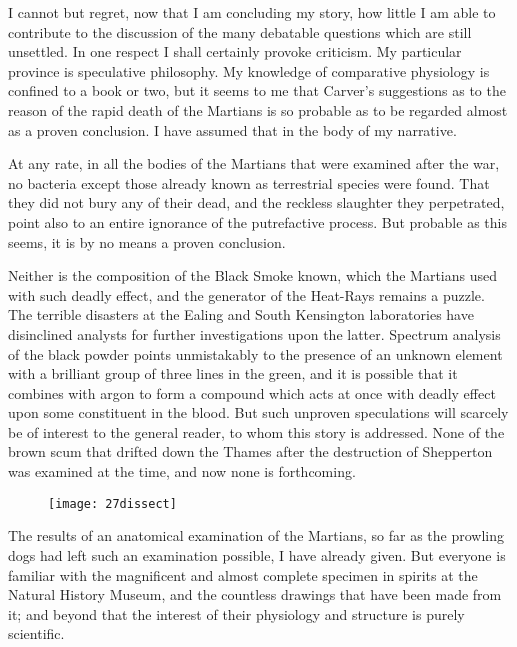 

	\lettrine[lines=4]{I}{} cannot but regret, now that I am concluding my story, how little I am able to contribute to the discussion of the many debatable questions which are still unsettled. In one respect I shall certainly provoke criticism. My particular province is speculative philosophy. My knowledge of comparative physiology is confined to a book or two, but it seems to me that Carver's suggestions as to the reason of the rapid death of the Martians is so probable as to be regarded almost as a proven conclusion. I have assumed that in the body of my narrative.

At any rate, in all the bodies of the Martians that were examined after the war, no bacteria except those already known as terrestrial species were found. That they did not bury any of their dead, and the reckless slaughter they perpetrated, point also to an entire ignorance of the putrefactive process. But probable as this seems, it is by no means a proven conclusion.

Neither is the composition of the Black Smoke known, which the Martians used with such deadly effect, and the generator of the Heat-Rays remains a puzzle. The terrible disasters at the Ealing and South Kensington laboratories have disinclined analysts for further investigations upon the latter. Spectrum analysis of the black powder points unmistakably to the presence of an unknown element with a brilliant group of three lines in the green, and it is possible that it combines with argon to form a compound which acts at once with deadly effect upon some constituent in the blood. But such unproven speculations will scarcely be of interest to the general reader, to whom this story is addressed. None of the brown scum that drifted down the Thames after the destruction of Shepperton was examined at the time, and now none is forthcoming.


\begin{figure}[tb]
\centering
\texttt{[image: 27dissect]}
\end{figure}

The results of an anatomical examination of the Martians, so far as the prowling dogs had left such an examination possible, I have already given. But everyone is familiar with the magnificent and almost complete specimen in spirits at the Natural History Museum, and the countless drawings that have been made from it; and beyond that the interest of their physiology and structure is purely scientific.

